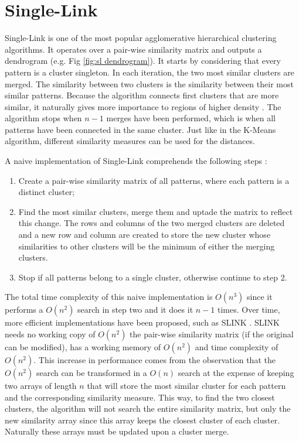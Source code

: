 \section{Single-Link}

Single-Link \cite{sneath1962numerical} is one of the most popular agglomerative hierarchical clustering algorithms.
It operates over a pair-wise similarity matrix and outputs a dendrogram (e.g. Fig \ref{fig:sl dendrogram}).
It starts by considering that every pattern is a cluster singleton.
In each iteration, the two most similar clusters are merged.
The similarity between two clusters is the similarity between their most similar patterns.
Because the algorithm connects first clusters that are more similar, it naturally gives more importance to regions of higher density \cite{Aggarwal2014}.
The algorithm stops when $n-1$ merges have been performed, which is when all patterns have been connected in the same cluster.
Just like in the K-Means algorithm, different similarity measures can be used for the distances.

A naive implementation of Single-Link comprehends the following steps \cite{Jain1999}:
\begin{enumerate}
    \item Create a pair-wise similarity matrix of all patterns, where each  pattern is a distinct cluster;

    \item Find the most similar clusters, merge them and uptade the matrix to reflect this change. The rows and columns of the two merged clusters are deleted and a new row and column are created to store the new cluster whose similarities to other clusters will be the minimum of either the merging clusters.

    \item Stop if all patterns belong to a single cluster, otherwise continue to step 2.
\end{enumerate}

The total time complexity of this naive implementation is $O(n^3)$ since it performs a $O(n^2)$ search in step two and it does it $n-1$ times.
Over time, more efficient implementations have been proposed, such as SLINK \cite{Sibson1973}.
SLINK needs no working copy of $O(n^2)$ the pair-wise similarity matrix (if the original can be modified), has a working memory of $O(n^2)$ and time complexity of $O(n^2)$.
This increase in performance comes from the observation that the $O(n^2)$ search can be transformed in a $O(n)$ search at the expense of keeping two arrays of length $n$ that will store the most similar cluster for each pattern and the corresponding similarity measure.
This way, to find the two closest clusters, the algorithm will not search the entire similarity matrix, but only the new similarity array since this array keeps the closest cluster of each cluster.
Naturally these arrays must be updated upon a cluster merge.

